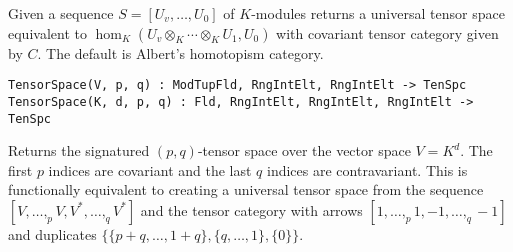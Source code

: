 Given a sequence $S=[U_v,\dots, U_0]$ of $K$-modules returns a universal tensor 
space equivalent to $\hom_K(U_v\otimes_K\cdots\otimes_K U_1,U_0)$ with covariant tensor 
category given by $C$. The default is Albert's homotopism category. 

\color{blue}
{\small \begin{verbatim}
TensorSpace(V, p, q) : ModTupFld, RngIntElt, RngIntElt -> TenSpc
TensorSpace(K, d, p, q) : Fld, RngIntElt, RngIntElt, RngIntElt -> TenSpc
\end{verbatim} }
\color{black}

Returns the signatured $(p,q)$-tensor space over the vector space $V=K^d$. 
The first $p$ indices are covariant and the last $q$ indices are contravariant.  
This is functionally equivalent
to creating a universal tensor space from the sequence 
$[V,\dots,_p V, V^*,\dots,_q V^*]$
and the tensor category with arrows $[1,\dots,_p 1, -1,\dots,_q -1]$ and 
duplicates $\{\{p+q,\dots,1+q\},\{q,\dots,1\},\{0\}\}$.


